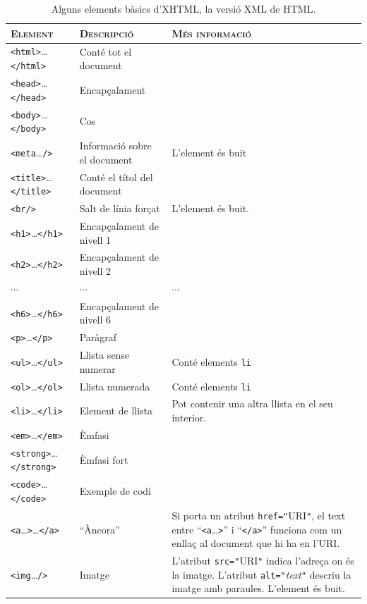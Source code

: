 \begin{table}
\begin{center}
\begin{tabular}{l|p{3.2cm}|p{4.3cm}}
  \hline\hline
  \textsc{Element} & \textsc{Descripció} & \textsc{Més informació} \\
  \hline
  \texttt{<html>}\ldots\texttt{</html>} & Conté tot el document & \\
  \hline
  \texttt{<head>}\ldots\texttt{</head>} & Encapçalament & \\\hline
  \texttt{<body>}\ldots\texttt{</body>} & Cos & \\\hline
  \texttt{<meta}\ldots\texttt{/>} & Informació sobre el document & L'element és
  buit \\\hline
  \texttt{<title>}\ldots\texttt{</title>} & Conté el títol del document & \\\hline
  \texttt{<br/>} & Salt de línia forçat & L'element és buit. \\\hline
  \texttt{<h1>}\ldots\texttt{</h1>} & Encapçalament de nivell 1 & \\\hline
  \texttt{<h2>}\ldots\texttt{</h2>} & Encapçalament de nivell 2 & \\\hline
  \(\cdots\) & \(\cdots\) & \(\cdots\) \\\hline
  \texttt{<h6>}\ldots\texttt{</h6>} & Encapçalament de nivell 6 & \\\hline
  \texttt{<p>}\ldots\texttt{</p>} & Paràgraf & 
  \\\hline
  \texttt{<ul>}\ldots\texttt{</ul>} & Llista sense numerar & Conté elements \texttt{li} \\\hline
  \texttt{<ol>}\ldots\texttt{</ol>} & Llista numerada & Conté elements \texttt{li} \\\hline
  \texttt{<li>}\ldots\texttt{</li>} & Element de llista & Pot contenir una altra
  llista en el seu interior. 
  \\\hline
  \texttt{<em>}\ldots\texttt{</em>} & Èmfasi & \\\hline
  \texttt{<strong>}\ldots\texttt{</strong>} & Èmfasi fort & \\\hline
  \texttt{<code>}\ldots\texttt{</code>} & Exemple de codi & \\\hline
  \texttt{<a}\ldots\texttt{>}\ldots\texttt{</a>} & ``Àncora'' & Si porta un atribut
  \texttt{href="}URI\texttt{"}, el text entre ``\texttt{<a}\ldots\texttt{>}'' i
  ``\texttt{</a>}'' funciona com un enllaç al document que hi ha en l'URI.\\\hline
  \texttt{<img}\ldots\texttt{/>} & Imatge & L'atribut  \texttt{src="}URI\texttt{"} indica l'adreça on és la imatge. 
  L'atribut \texttt{alt="}\emph{text}\texttt{"} descriu la imatge amb paraules. L'element és buit.\\\hline
\end{tabular}
\end{center}
\caption{Alguns elements bàsics d'XHTML, la versió XML de HTML.}
\label{tb:15etiq}
\end{table}

